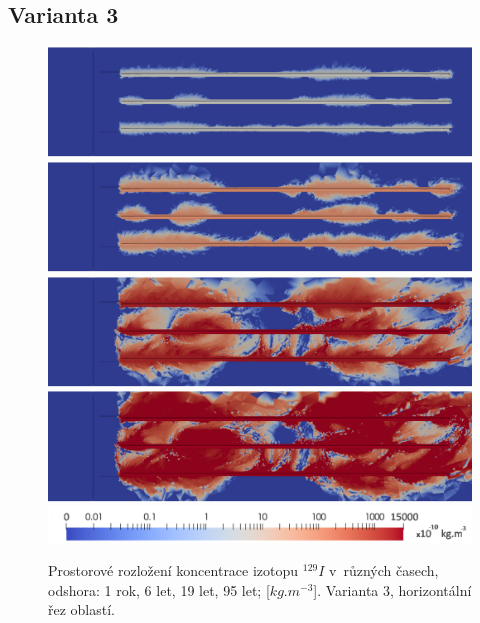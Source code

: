 \documentclass[11pt,a4paper]{article}
\begin{document}
\begin{onehalfspacing}
\subsection{Varianta 3}
\begin{figure}[H]
\centering
\includegraphics[width=16cm]{graphics/obr_ralek/var3/02_1y.png}
\includegraphics[width=16cm]{graphics/obr_ralek/var3/04_6y.png}
\includegraphics[width=16cm]{graphics/obr_ralek/var3/06_19y.png}
\includegraphics[width=16cm]{graphics/obr_ralek/var3/07_95y.png}
\includegraphics[width=16cm]{graphics/obr_ralek/var3/skala_nek_zdroj_vypnuti.png}
\caption{Prostorové rozložení koncentrace izotopu $^{129}I$ v~různých časech, odshora: 1 rok, 6 let, 19 let, 95 let; [$kg.m^{-3}$]. Varianta 3, horizontální řez oblastí.}
\label{nek_zdroj_vyp_01}
\end{figure}


\end{onehalfspacing}
\end{document}
